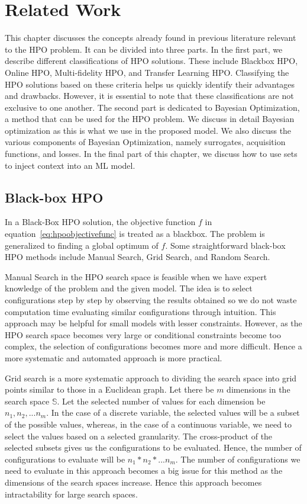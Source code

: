 \documentclass[12pt, twoside, ngerman]{report}
\begin{document}
\chapter{Related Work}\label{chap:relatedWork}

This chapter discusses the concepts already found in previous literature relevant to the HPO problem. It can be divided into three parts.
In the first part, we describe different classifications of HPO solutions. These include Blackbox HPO, Online HPO, Multi-fidelity HPO, and Transfer Learning HPO. Classifying the HPO solutions based on these criteria helps us quickly identify their advantages and drawbacks. However, it is essential to note that these classifications are not exclusive to one another. 
The second part is dedicated to Bayesian Optimization, a method that can be used for the HPO problem. We discuss in detail Bayesian optimization as this is what we use in the proposed model. We also discuss the various components of Bayesian Optimization, namely surrogates, acquisition functions, and losses.
In the final part of this chapter, we discuss how to use sets to inject context into an ML model.


\section{Black-box HPO}
In a Black-Box HPO solution, the objective function $f$ in equation~\ref{eq:hpoobjectivefunc}
is treated as a blackbox.
The problem is generalized to finding a global optimum of $f$.
Some straightforward black-box HPO methods include Manual Search,  Grid Search, and Random Search.

Manual Search in the HPO search space is feasible when we have expert knowledge of the problem and the given model. 
The idea is to select configurations step by step by observing the results obtained so we do not waste computation time evaluating similar configurations through intuition.
This approach may be helpful for small models with lesser constraints.
However, as the HPO search space becomes very large or conditional constraints become too complex, the selection of configurations becomes more and more difficult.
Hence a more systematic and automated approach is more practical.

Grid search is a more systematic approach to dividing the search space into grid points similar to those in a Euclidean graph.
Let there be $m$ dimensions in the search space $\mathbb{S}$. Let the selected number of values for each dimension be $n_1, n_2, ... n_m$. In the case of a discrete variable, the selected values will be a subset of the possible values, whereas, in the case of a continuous variable, we need to select the values based on a selected granularity.
The cross-product of the selected subsets gives us the configurations to be evaluated. Hence, the number of configurations to evaluate will be $n_1 * n_2 * ... n_m$.
The number of configurations we need to evaluate in this approach becomes a big issue for this method as the dimensions of the search spaces increase.
Hence this approach becomes intractability for large search spaces.
\end{document}
